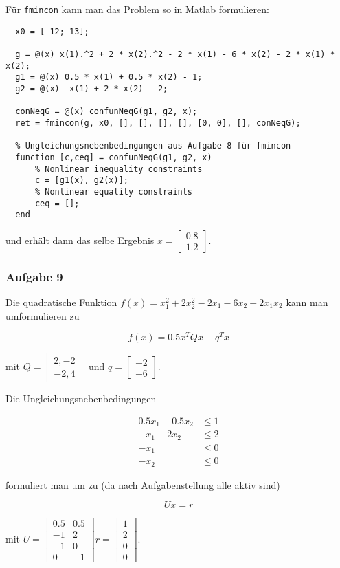 \documentclass[a4paper, 12pt]{report}
\begin{document}
Für \lstinline[basicstyle=\ttfamily]|fmincon| kann man das Problem so in Matlab formulieren:

\begin{lstlisting}
  x0 = [-12; 13];

  g = @(x) x(1).^2 + 2 * x(2).^2 - 2 * x(1) - 6 * x(2) - 2 * x(1) * x(2);
  g1 = @(x) 0.5 * x(1) + 0.5 * x(2) - 1;
  g2 = @(x) -x(1) + 2 * x(2) - 2;

  conNeqG = @(x) confunNeqG(g1, g2, x);
  ret = fmincon(g, x0, [], [], [], [], [0, 0], [], conNeqG);
  
  % Ungleichungsnebenbedingungen aus Aufgabe 8 für fmincon
  function [c,ceq] = confunNeqG(g1, g2, x)
      % Nonlinear inequality constraints
      c = [g1(x), g2(x)];
      % Nonlinear equality constraints
      ceq = [];
  end\end{lstlisting}

und erhält dann das selbe Ergebnis $x = \begin{bmatrix}0.8\\1.2\end{bmatrix}$.

\subsubsection{Aufgabe 9}
Die quadratische Funktion $f(x) = x_1^2 + 2x_2^2 - 2x_1 - 6x_2 - 2x_1x_2$ kann man umformulieren zu

$$ f(x) = 0.5x^TQx + q^Tx $$

mit $Q = \begin{bmatrix}2, -2\\-2, 4\end{bmatrix}$ und $q = \begin{bmatrix}-2\\-6\end{bmatrix}$.

Die Ungleichungsnebenbedingungen

\begin{align*} 
  0.5x_1 + 0.5x_2 &\leq 1\\
  -x_1 + 2x_2 &\leq 2\\
  -x_1 &\leq 0\\
  -x_2 &\leq 0
\end{align*}

formuliert man um zu (da nach Aufgabenstellung alle aktiv sind)

$$ Ux = r$$

mit $ U = \begin{bmatrix} 0.5 & 0.5\\-1 & 2\\-1 & 0\\0 & -1 \end{bmatrix} r = \begin{bmatrix}1\\2\\0\\0\end{bmatrix} $.
\end{document}

